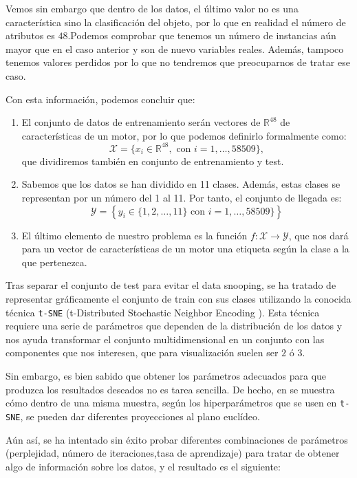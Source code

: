 \documentclass[a4paper, 20pt]{article}
\newcommand{\R}{\mathbb R}
\begin{document}
Vemos sin embargo que dentro de los datos, el último valor no es una característica sino la clasificación del objeto, por lo que en realidad el número de atributos es $48$.Podemos comprobar que tenemos un número de instancias aún mayor que en el caso anterior y son de nuevo variables reales. Además, tampoco tenemos valores perdidos por lo que no tendremos que preocuparnos de tratar ese caso. 

Con esta información, podemos concluir que:

\begin{enumerate}
\item El conjunto de datos de entrenamiento serán vectores de $\R^{48}$ de características de un motor, por lo que podemos definirlo formalmente como:
$$
\mathcal X = \{ x_i \in \R^{48}, \text{ con } i= 1, \dots, 58509\},
$$
que dividiremos también en conjunto de entrenamiento y test.

\item Sabemos que los datos se han dividido en 11 clases. Además, estas clases se representan por un número del 1 al 11. Por tanto, el conjunto de llegada es:
$$
\mathcal Y = \left\{ y_i \in \{1,2,\dots,11\} \text{ con } i = 1,\dots, 58509\}\right\}
$$
\item El último elemento de nuestro problema es la función $f: \mathcal X \to \mathcal Y$, que nos dará para un vector de características de un motor una etiqueta según la clase a la que pertenezca.
\end{enumerate}


Tras separar el conjunto de test para evitar el data snooping, se ha tratado de representar gráficamente el conjunto de train con sus clases utilizando la conocida técnica \lstinline{t-SNE} (t-Distributed Stochastic Neighbor Encoding \cite{van_der_maaten_viualizing_2008}). Esta técnica requiere una serie de parámetros que dependen de la distribución de los datos y nos ayuda transformar el conjunto multidimensional en un conjunto con las componentes que nos interesen, que para visualización suelen ser $2$ ó $3$. 


Sin embargo, es bien sabido que obtener los parámetros adecuados para que produzca los resultados deseados no es tarea sencilla. De hecho, en \cite{wattenberg_how_2016} se muestra cómo dentro de una misma muestra, según los hiperparámetros que se usen en \lstinline{t-SNE}, se pueden dar diferentes proyecciones al plano euclídeo. 

Aún así, se ha intentado sin éxito probar diferentes combinaciones de parámetros (perplejidad, número de iteraciones,tasa de aprendizaje) para tratar de obtener algo de información sobre los datos, y el resultado es el siguiente:
\end{document}
